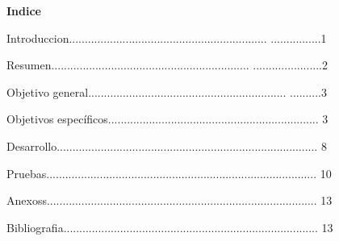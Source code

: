 \documentclass[10pt,a4paper]{report}
\begin{document}
\begin{titlepage}
\begin{flushleft}
{\Large\bfseries \center Indice\par}
\vspace{.5cm}
Introduccion...............................................................
................1\par
 \vspace{1cm}
Resumen...............................................................
......................2\par
 \vspace{1cm}
Objetivo general...............................................................
..........3\par \vspace{1cm}
Objetivos específicos...................................................................
3\par \vspace{1cm}
Desarrollo...................................................................................
8\par \vspace{1cm}
Pruebas......................................................................................
10\par \vspace{1cm}
Anexoss......................................................................................
13\par \vspace{1cm}
Bibliografia.................................................................................
13\par \vspace{1cm}
\end{flushleft}
\end{titlepage}

\end{document}

